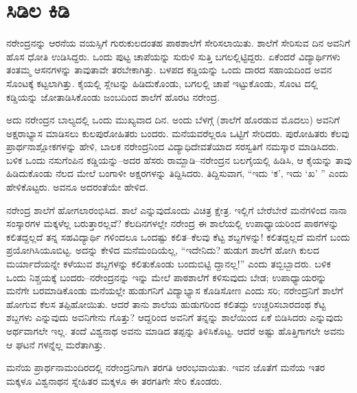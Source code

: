 
\chapter{ಸಿಡಿಲ ಕಿಡಿ}

\noindent

ನರೇಂದ್ರನನ್ನು ಆರನೆಯ ವಯಸ್ಸಿಗೆ ಗುರುಕುಲದಂತಹ ಪಾಠಶಾಲೆಗೆ ಸೇರಿಸಲಾಯಿತು. ಶಾಲೆಗೆ ಸೇರಿಸುವ ದಿನ ಅವನಿಗೆ ಹೊಸ ಧೋತಿ ಉಡಿಸಿದ್ದರು. ಒಂದು ಪುಟ್ಟ ಚಾಪೆಯನ್ನು ಸುರುಳಿ ಸುತ್ತಿ ಬಗಲಲ್ಲಿಟ್ಟಿದ್ದರು. ಏಕೆಂದರೆ ವಿದ್ಯಾರ್ಥಿಗಳು ತಂತಮ್ಮ ಆಸನಗಳನ್ನು ತಾವುತಾವೇ ತರಬೇಕಾಗಿತ್ತು. ಬಳಪದ ಕಡ್ಡಿಯನ್ನು ಒಂದು ದಾರದ ಸಹಾಯದಿಂದ ಅವನ ಸೊಂಟಕ್ಕೆ ಕಟ್ಟಲಾಗಿತ್ತು. ಕೈಯಲ್ಲಿ ಸ್ಲೇಟನ್ನು ಹಿಡಿದುಕೊಂಡು, ಬಗಲಲ್ಲಿ ಚಾಪೆ ಇಟ್ಟುಕೊಂಡು, ಸೊಂಟ ದಲ್ಲಿ ಕಡ್ಡಿಯನ್ನು ಜೋತಾಡಿಸಿಕೊಂಡು ಜಂಬದಿಂದ ಶಾಲೆಗೆ ಹೊರಟ ನರೇಂದ್ರ.

ಅದು ನರೇಂದ್ರನ ಬಾಲ್ಯದಲ್ಲಿ ಒಂದು ಮುಖ್ಯವಾದ ದಿನ. ಅಂದು ಬೆಳಗ್ಗೆ (ಶಾಲೆಗೆ ಹೊರಡುವ ಮೊದಲು) ಅವನಿಗೆ ಅಕ್ಷರಾಭ್ಯಾಸ ಮಾಡಿಸಲು ಕುಲಪುರೋಹಿತರು ಬಂದರು. ಮನೆಯವರೆಲ್ಲರೂ ಒಟ್ಟಿಗೆ ಸೇರಿದರು. ಪುರೋಹಿತರು ಕೆಲವು ಪ್ರಾರ್ಥನಾಶ್ಲೋಕಗಳನ್ನು ಹೇಳಿ, ಬಾಲಕ ನರೇಂದ್ರನಿಂದ ವಿದ್ಯಾಧಿದೇವತೆಯಾದ ಸರಸ್ವತಿಗೆ ನಮಸ್ಕಾರ ಮಾಡಿಸಿದರು. ಬಳಿಕ ಒಂದು ನಸುಗೆಂಪಿನ ಕಡ್ಡಿಯನ್ನು–ಅದರ ಹೆಸರು ರಾಮ್ಖಾಡಿ–ನರೇಂದ್ರನ ಬಲಗೈಯಲ್ಲಿ ಹಿಡಿಸಿ, ಆ ಕೈಯನ್ನು ತಾವು ಹಿಡಿದುಕೊಂಡು ನೆಲದ ಮೇಲೆ ಬಂಗಾಳೀ ಅಕ್ಷರಗಳನ್ನು ತಿದ್ದಿಸಿದರು. ತಿದ್ದಿಸುವಾಗ, “ಇದು ‘ಕ’, ಇದು ‘ಖ’ ” ಎಂದು ಹೇಳಿಕೊಟ್ಟರು. ಅವನೂ ಅದರಂತೆಯೇ ಹೇಳಿದ.

ನರೇಂದ್ರ ಶಾಲೆಗೆ ಹೋಗಲಾರಂಭಿಸಿದ. ಶಾಲೆ ಎನ್ನುವುದೊಂದು ವಿಚಿತ್ರ ಕ್ಷೇತ್ರ. ಇಲ್ಲಿಗೆ ಬೇರೆಬೇರೆ ಮನೆಗಳಿಂದ ನಾನಾ ಸಂಸ್ಕಾರಗಳ ಮಕ್ಕಳೆಲ್ಲ ಬರುತ್ತಾರಲ್ಲವೆ? ಕೆಲದಿನಗಳಲ್ಲೇ ನರೇಂದ್ರ ಈ ಶಾಲೆಯಲ್ಲಿ ಉಪಾಧ್ಯಾಯರಿಂದ ಪಾಠಗಳನ್ನು ಕಲಿತದ್ದಲ್ಲದೆ ತನ್ನ ಸಹವಿದ್ಯಾರ್ಥಿ ಗಳಿಂದಲೂ ಒಂದಷ್ಟು ಕಲಿತ–ಕೆಲವು ಕೆಟ್ಟ ಶಬ್ದಗಳನ್ನು! ಕಲಿತದ್ದಲ್ಲದೆ ಮನೆಗೆ ಬಂದು ಪ್ರಯೋಗಿಸಿಯೂಬಿಟ್ಟ. ಅದನ್ನು ಕೇಳಿದ ಮನೆಮಂದಿಯೆಲ್ಲ, “ಇದೇನಿದು? ಹುಡುಗ ಶಾಲೆಗೆ ಹೋಗಿ ಕುಲದ ಮರ್ಯಾದೆಯನ್ನೇ ಕಳೆಯುವ ಶಬ್ದಗಳನ್ನು ಕಲಿತುಕೊಂಡು ಬಂದುಬಿಟ್ಟಿ ದ್ದಾನಲ್ಲ!” ಎಂದು ತಬ್ಬಿಬ್ಬಾದರು. ಬಳಿಕ ಒಂದು ನಿಶ್ಚಯಕ್ಕೆ ಬಂದರು–ನರೇಂದ್ರನನ್ನು ಇನ್ನು ಮೇಲೆ ಪಾಠಶಾಲೆಗೆ ಕಳಿಸುವುದು ಬೇಡ; ಉಪಾಧ್ಯಾಯರನ್ನು ಮನೆಗೇ ಬರಮಾಡಿಕೊಂಡು ಮನೆಯಲ್ಲೇ ಹುಡುಗನಿಗೆ ವಿದ್ಯಾಭ್ಯಾಸ ಕೊಡಿಸೋಣ ಎಂದು ಸರಿ; ನರೇಂದ್ರನಿಗೆ ಶಾಲೆಗೆ ಹೋಗುವ ಕೆಲಸ ತಪ್ಪಿಹೋಯಿತು. ಆದರೆ ತಾನು ಶಾಲೆಯ ಹುಡುಗರಿಂದ ಕಲಿತದ್ದು ಉಚ್ಚರಿಸಬಾರದಂಥ ಕೆಟ್ಟ ಶಬ್ದಗಳು ಎನ್ನುವುದು ಅವನಿಗೇನು ಗೊತ್ತು? ಆದ್ದರಿಂದ ಅವನಿಗೆ ತನ್ನನ್ನು ಶಾಲೆಯಿಂದ ಏಕೆ ಬಿಡಿಸಿದರು ಎನ್ನುವುದು ಅರ್ಥವಾಗಲೇ ಇಲ್ಲ. ತಂದೆ ವಿಶ್ವನಾಥ ಅವನು ಮಾಡಿದ ತಪ್ಪನ್ನು ತಿಳಿಸಿಕೊಟ್ಟ. ಆದರೆ ಅಷ್ಟು ಹೊತ್ತಿಗಾಗಲೇ ಅವನು ಆ ಘಟನೆ ಗಳನ್ನೆಲ್ಲ ಮರೆತಾಗಿತ್ತು.

ಮನೆಯ ಪ್ರಾರ್ಥನಾಮಂದಿರದಲ್ಲಿ ನರೇಂದ್ರನಿಗಾಗಿ ತರಗತಿ ಆರಂಭವಾಯಿತು. ಇವನ ಜೊತೆಗೆ ಮನೆಯ ಇತರ ಮಕ್ಕಳೂ ವಿಶ್ವನಾಥನ ಸ್ನೇಹಿತರ ಮಕ್ಕಳೂ ಈ ತರಗತಿಗೇ ಸೇರಿ ಕೊಂಡರು.

